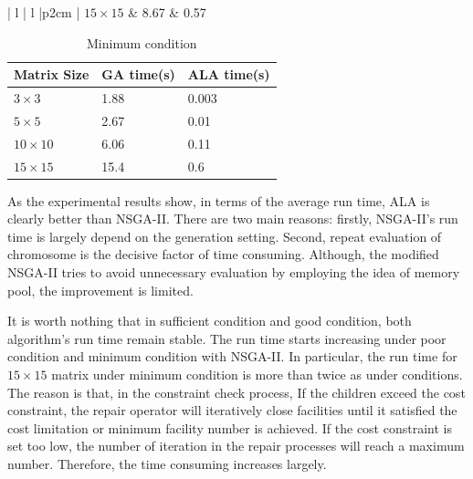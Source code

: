 \documentclass[twoside]{article}
\begin{document}
\begin{table}[!htb]
\begin{minipage}{.5\linewidth}
\begin{tabular}{ | l | l |p{2cm} |}
		$15 \times 15$  & 8.67 & 0.57\\ \hline
	\end{tabular}
	\end{minipage}
	\label{table:poor}
\begin{minipage}{.5\linewidth}
	\caption{Minimum condition}
	\begin{tabular}{ | l | l |p{2cm} |}
		\hline
		Matrix Size & GA time(s) & ALA time(s)\\ \hline
		$3 \times 3$  & 1.88 & 0.003\\ \hline
		$5 \times 5$  & 2.67 & 0.01 \\ \hline
		$10 \times 10$ &6.06 & 0.11\\ \hline
		$15 \times 15$  & 15.4 & 0.6\\ \hline
	\end{tabular}
	\end{minipage}
	\label{table:minimum}
\end{table}

As the experimental results show, in terms of the average run time, ALA is clearly better than NSGA-II. 
There are two main reasons: firstly, NSGA-II's run time is largely depend on the generation setting.
Second, repeat evaluation of chromosome is the decisive factor of time consuming. Although, the modified
NSGA-II tries to avoid unnecessary evaluation by employing the idea of memory pool, the improvement is limited. 

It is worth nothing that in sufficient condition and good condition, both algorithm's run time remain stable. The run time starts
increasing under poor condition and minimum condition with NSGA-II. In particular, the run time for $15 \times 15$ matrix under 
minimum condition is more than twice as under conditions.  The reason is that, in the constraint check process, 
If the children exceed the cost constraint, 
the repair operator will iteratively close facilities until it satisfied the cost limitation or minimum facility number is achieved. 
If the cost constraint is set too low, the number of iteration in the repair 
processes will reach a maximum number. Therefore, the time consuming increases largely.
\end{document}
